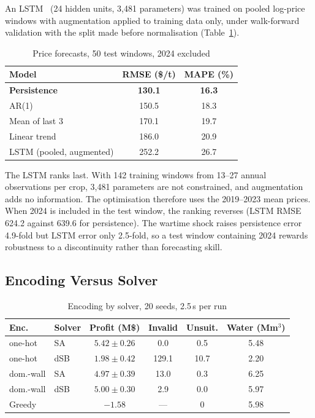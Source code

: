 \documentclass[conference,a4paper]{IEEEtran}
\begin{document}
An LSTM~\cite{hochreiter1997} (24 hidden units, 3{,}481 parameters) was trained
on pooled log-price windows with augmentation applied to training data only,
under walk-forward validation with the split made before normalisation
(Table~\ref{tab:lstm}).

\begin{table}[t]
\centering
\caption{Price forecasts, 50 test windows, 2024 excluded}
\label{tab:lstm}
\footnotesize
\begin{tabular}{lcc}
\toprule
Model & RMSE (\$/t) & MAPE (\%) \\
\midrule
\textbf{Persistence} & \textbf{130.1} & \textbf{16.3} \\
AR(1) & 150.5 & 18.3 \\
Mean of last 3 & 170.1 & 19.7 \\
Linear trend & 186.0 & 20.9 \\
LSTM (pooled, augmented) & 252.2 & 26.7 \\
\bottomrule
\end{tabular}
\end{table}

The LSTM ranks last. With 142 training windows from 13--27 annual observations
per crop, 3{,}481 parameters are not constrained, and augmentation adds no
information. The optimisation therefore uses the 2019--2023 mean prices. When
2024 is included in the test window, the ranking reverses (LSTM RMSE 624.2
against 639.6 for persistence). The wartime shock raises persistence error
4.9-fold but LSTM error only 2.5-fold, so a test window containing 2024
rewards robustness to a discontinuity rather than forecasting skill.

\subsection{Encoding Versus Solver}

\begin{table}[t]
\centering
\caption{Encoding by solver, 20 seeds, 2.5\,s per run}
\label{tab:bench}
\footnotesize
\setlength{\tabcolsep}{4pt}
\begin{tabular}{llcccc}
\toprule
Enc. & Solver & Profit (M\$) & Invalid & Unsuit. & Water (Mm$^3$) \\
\midrule
one-hot & SA  & $5.42\pm0.26$ & 0.0   & 0.5  & 5.48 \\
one-hot & dSB & $1.98\pm0.42$ & 129.1 & 10.7 & 2.20 \\
dom.-wall & SA  & $4.97\pm0.39$ & 13.0 & 0.3 & 6.25 \\
dom.-wall & dSB & $5.00\pm0.30$ & 2.9  & 0.0 & 5.97 \\
\midrule
\multicolumn{2}{l}{Greedy} & $-1.58$ & --- & 0 & 5.98 \\
\bottomrule
\end{tabular}
\end{table}
\end{document}
